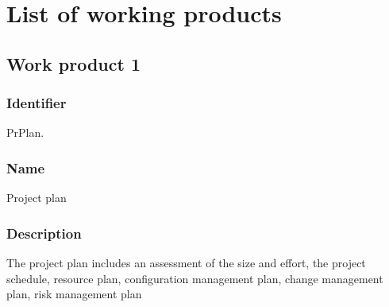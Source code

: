 \section{List of working products}

\subsection{Work product 1}

\subsubsection{Identifier}

PrPlan.

\subsubsection{Name}

Project plan

\subsubsection{Description}
 
The project plan includes an assessment of the size and effort, the project
schedule, resource plan, configuration management plan,
change management plan, risk management plan